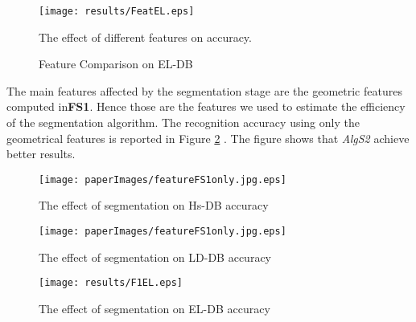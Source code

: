  \begin{figure}
	\centering
		\texttt{[image: results/FeatEL.eps]}
	\caption{Feature Comparison on EL-DB} The effect of different features on accuracy.  %
	\label{fig:testFeaturesAll}
\end{figure}  


 The main features affected by the segmentation stage are the geometric features computed in\textbf{FS1}. Hence those are the features we used to estimate the efficiency of the segmentation algorithm. The recognition accuracy using only the geometrical features is reported in Figure \ref{fig:testFeatonly} . The figure shows that \textsl{AlgS2} achieve better results.  %
 \begin{figure}
	\centering
		\texttt{[image: paperImages/featureFS1only.jpg.eps]}
	\caption{The effect of segmentation on Hs-DB accuracy} %
	\label{fig:testFeatonly}
\end{figure}  
 \begin{figure}
	\centering
		\texttt{[image: paperImages/featureFS1only.jpg.eps]}
	\caption{The effect of segmentation on LD-DB accuracy} %
	\label{fig:LDtestFeatonly}
\end{figure}  
 \begin{figure}
	\centering
		\texttt{[image: results/F1EL.eps]}
	\caption{The effect of segmentation on EL-DB accuracy} %
	\label{fig:ELtestFeatonly}
\end{figure}  
%
%


